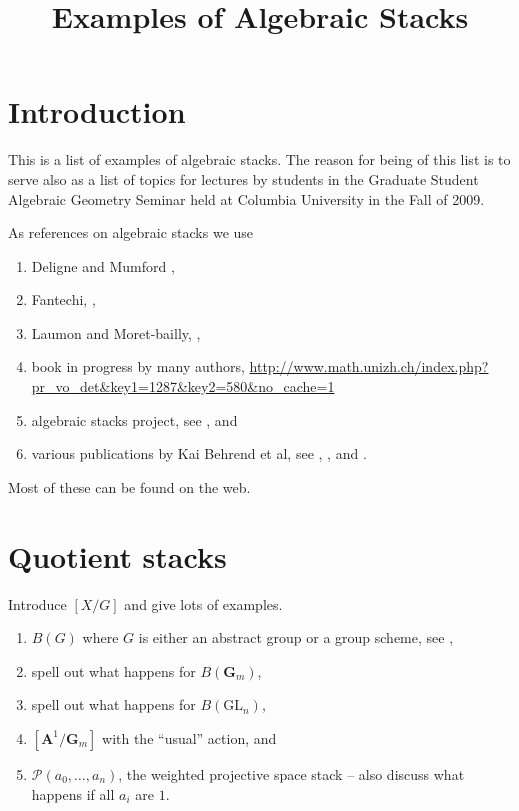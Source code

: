 \documentclass{amsart}
\theoremstyle{plain}
\theoremstyle{definition}
\theoremstyle{remark}
\numberwithin{equation}{subsection}
\begin{document}
\title{Examples of Algebraic Stacks}


\maketitle

\label{section-phantom}

\tableofcontents

\section{Introduction}
\label{section-introduction}

\noindent
This is a list of examples of algebraic stacks.
The reason for being of this list is to serve also as a list of
topics for lectures by students in the Graduate Student Algebraic Geometry
Seminar held at Columbia University in the Fall of 2009.

\medskip\noindent
As references on algebraic stacks we use
\begin{enumerate}
\item Deligne and Mumford \cite[Section 4]{DM},
\item Fantechi, \cite{Fantechi},
\item Laumon and Moret-bailly, \cite{LM-B},
\item book in progress by many authors,
\url{http://www.math.unizh.ch/index.php?pr_vo_det&key1=1287&key2=580&no_cache=1}
\item algebraic stacks project, see \cite{stacks-project}, and
\item various publications by Kai Behrend et al, see
\cite{derived-l-adic-for-stacks},
\cite{cohomology-of-stacks}, and
\cite{uniformization-stacky-curves}.
\end{enumerate}
Most of these can be found on the web.

\section{Quotient stacks}
\label{section-quotient-stacks}

\noindent
Introduce $[X/G]$ and give lots of examples.
\begin{enumerate}
\item $B(G)$ where $G$ is either an abstract group or a group scheme, see
\cite[Examples \href{http://math.columbia.edu/algebraic_geometry/%
stacks-git/locate.php?tag=0370}{0370} and
\href{http://math.columbia.edu/algebraic_geometry/%
stacks-git/locate.php?tag=0371}{0371}]{stacks-project},
\item spell out what happens for $B(\mathbf{G}_m)$,
\item spell out what happens for $B(\text{GL}_n)$,
\item $[\mathbf{A}^1/\mathbf{G}_m]$ with the ``usual'' action, and
\item $\mathcal{P}(a_0, \ldots, a_n)$, the weighted projective space stack
-- also discuss what happens if all $a_i$ are $1$.
\end{enumerate}
\end{document}
